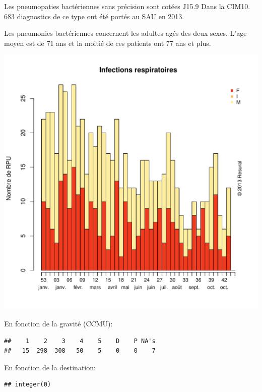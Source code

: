 \documentclass[12pt,english,french,twoside]{report}\usepackage[]{graphicx}\usepackage[]{color}
\makeatletter
\def\maxwidth{ %
  \ifdim\Gin@nat@width>\linewidth
    \linewidth
  \else
    \Gin@nat@width
  \fi
}
\newenvironment{kframe}{%
 \def\at@end@of@kframe{}%
 \ifinner\ifhmode%
  \def\at@end@of@kframe{\end{minipage}}%
  \begin{minipage}{\columnwidth}%
 \fi\fi%
 \def\FrameCommand##1{\hskip\@totalleftmargin \hskip-\fboxsep
 \colorbox{shadecolor}{##1}\hskip-\fboxsep
     \hskip-\linewidth \hskip-\@totalleftmargin \hskip\columnwidth}%
 \MakeFramed {\advance\hsize-\width
   \@totalleftmargin\z@ \linewidth\hsize
   \@setminipage}}%
 {\par\unskip\endMakeFramed%
 \at@end@of@kframe}
\newenvironment{knitrout}{}{} %
\makeatother
\begin{document}
Les pneumopaties bactériennes sans précision sont cotées J15.9 Dans la CIM10.
683 diagnostics de ce type ont été portés au SAU en 2013.

Les pneumonies bactériennes concernent les adultes agés des deux sexes. L'age moyen est de 71 ans et la moitié de ces patients ont 77 ans et plus.

\begin{knitrout}
\color{fgcolor}
\includegraphics[width=\maxwidth]{figure/pneumo} 

\end{knitrout}


En fonction de la gravité (CCMU):
\begin{knitrout}
\color{fgcolor}\begin{kframe}
\begin{verbatim}
##    1    2    3    4    5    D    P NA's 
##   15  298  308   50    5    0    0    7
\end{verbatim}
\end{kframe}
\end{knitrout}


En fonction de la destination:
\begin{knitrout}
\color{fgcolor}\begin{kframe}
\begin{verbatim}
## integer(0)
\end{verbatim}
\end{kframe}
\end{knitrout}
\end{document}
